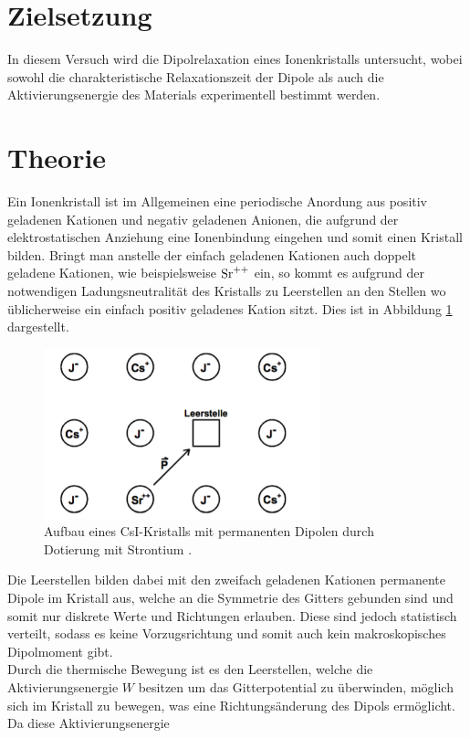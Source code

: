 
\label{sec:Theorie}
\section{Zielsetzung}

In diesem Versuch wird die Dipolrelaxation eines Ionenkristalls untersucht,
wobei sowohl die charakteristische Relaxationszeit der Dipole als
auch die Aktivierungsenergie des Materials experimentell bestimmt werden.

\section{Theorie}
Ein Ionenkristall ist im Allgemeinen eine periodische Anordung aus positiv geladenen
Kationen und negativ geladenen Anionen, die aufgrund der elektrostatischen Anziehung
eine Ionenbindung eingehen und somit einen Kristall bilden. Bringt man anstelle
der einfach geladenen Kationen auch doppelt geladene Kationen, wie beispielsweise
$\ce{Sr^{++}}$ ein, so kommt es aufgrund der notwendigen Ladungsneutralität des Kristalls
zu Leerstellen an den Stellen wo üblicherweise ein einfach positiv geladenes Kation
sitzt. Dies ist in Abbildung \ref{fig:ion} dargestellt.
\begin{figure}
  \centering
  \includegraphics[width=8cm]{ion.png}
  \caption{Aufbau eines CsI-Kristalls mit permanenten Dipolen durch Dotierung mit Strontium \cite{skript}.}
  \label{fig:ion}
\end{figure}
Die Leerstellen bilden dabei mit den zweifach geladenen Kationen permanente
Dipole im Kristall aus, welche an die Symmetrie des Gitters gebunden sind und
somit nur diskrete Werte und Richtungen erlauben. Diese sind jedoch statistisch verteilt,
sodass es keine Vorzugsrichtung und somit auch kein makroskopisches Dipolmoment gibt. \\
Durch die thermische Bewegung ist es den Leerstellen, welche die Aktivierungsenergie
$W$ besitzen um das Gitterpotential zu überwinden, möglich sich im Kristall zu bewegen,
was eine Richtungsänderung des Dipols ermöglicht. Da diese Aktivierungsenergie
